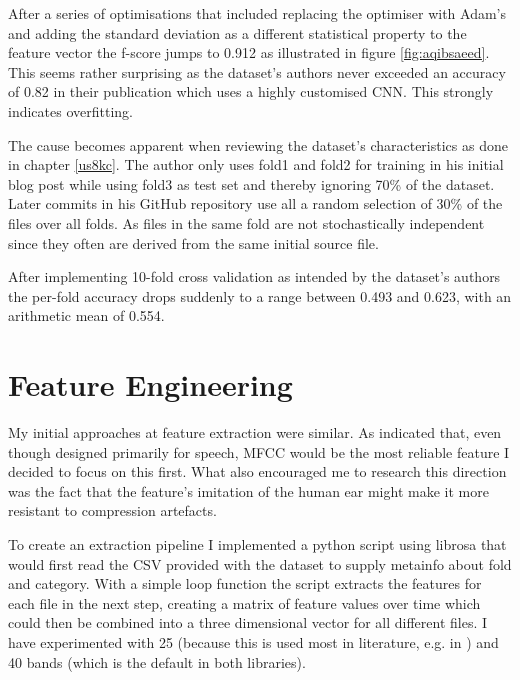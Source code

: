 After a series of optimisations that included replacing the optimiser with Adam's and adding the standard deviation as a different statistical property to the feature vector the f-score jumps to 0.912 as illustrated in figure \ref{fig:aqibsaeed}. This seems rather surprising as the dataset's authors never exceeded an accuracy of 0.82 in their publication \cite{DBLP:journals/corr/SalamonB16} which uses a highly customised CNN. This strongly indicates overfitting.

The cause becomes apparent when reviewing the dataset's characteristics as done in chapter \ref{us8kc}. The author only uses fold1 and fold2 for training in his initial blog post while using fold3 as test set and thereby ignoring 70\% of the dataset. Later commits in his GitHub repository use all a random selection of 30\% of the files over all folds. As files in the same fold are not stochastically independent since they often are derived from the same initial source file.


After implementing 10-fold cross validation as intended by the dataset's authors the per-fold accuracy drops suddenly to a range between 0.493 and 0.623, with an arithmetic mean of 0.554.



\section{Feature Engineering}

My initial approaches at feature extraction were similar. As \cite{DBLP:journals/corr/SalamonB16} indicated that, even though designed primarily for speech, MFCC would be the most reliable feature I decided to focus on this first. What also encouraged me to research this direction was the fact that the feature's imitation of the human ear might make it more resistant to compression artefacts.

To create an extraction pipeline I implemented a python script using librosa that would first read the CSV  provided with the dataset to supply metainfo about fold and category.
With a simple loop function the script extracts the features for each file in the next step, creating a matrix of feature values over time which could then be combined into a three dimensional vector for all different files. I have experimented with 25 (because this is used most in literature, e.g. in \cite{7177954}) and 40 bands (which is the default in both libraries).


